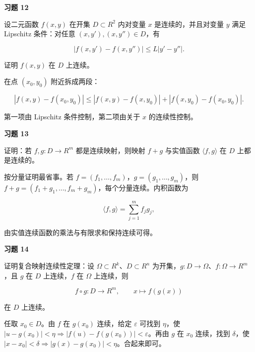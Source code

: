 \begin{exercisebox}
\textbf{习题 12}

设二元函数 \(f(x,y)\) 在开集 \(D\subset R^2\) 内对变量 \(x\) 是连续的，并且对变量 \(y\) 满足 Lipschitz 条件：对任意 \((x,y'),(x,y'')\in D\)，有

\[
        |f(x,y')-f(x,y'')|\le L|y'-y''|.
      \]

证明 \(f(x,y)\) 在 \(D\) 上连续。

\begin{hintbox}
在点 \((x_0,y_0)\) 附近拆成两段：

\[
          |f(x,y)-f(x_0,y_0)|
          \le |f(x,y)-f(x,y_0)|+|f(x,y_0)-f(x_0,y_0)|.
        \]

第一项由 Lipschitz 条件控制，第二项由关于 \(x\) 的连续性控制。
\end{hintbox}
\end{exercisebox}

\begin{exercisebox}
\textbf{习题 13}

证明：若 \(f,g:D\to R^m\) 都是连续映射，则映射 \(f+g\) 与实值函数 \(\langle f,g\rangle\) 在 \(D\) 上都是连续的。

\begin{hintbox}
按分量证明最省事。若 \(f=(f_1,\ldots,f_m)\)，\(g=(g_1,\ldots,g_m)\)，则 \(f+g=(f_1+g_1,\ldots,f_m+g_m)\)，每个分量连续。内积函数为

\[
          \langle f,g\rangle=\sum_{j=1}^{m}f_jg_j,
        \]

由实值连续函数的乘法与有限求和保持连续可得。
\end{hintbox}
\end{exercisebox}

\begin{exercisebox}
\textbf{习题 14}

证明复合映射连续性定理：设 \(\Omega\subset R^k\)、\(D\subset R^n\) 为开集，\(g:D\to\Omega\)、\(f:\Omega\to R^m\)，且 \(g\) 在 \(D\) 上连续，\(f\) 在 \(\Omega\) 上连续，则

\[
        f\circ g:D\to R^m,\qquad x\mapsto f(g(x))
      \]

在 \(D\) 上连续。

\begin{hintbox}
任取 \(x_0\in D\)。由 \(f\) 在 \(g(x_0)\) 连续，给定 \(\varepsilon\) 可找到 \(\eta\)，使 \(|u-g(x_0)|<\eta\Rightarrow |f(u)-f(g(x_0))|<\varepsilon\)。再由 \(g\) 在 \(x_0\) 连续，找到 \(\delta\)，使 \(|x-x_0|<\delta\Rightarrow |g(x)-g(x_0)|<\eta\)。合起来即可。
\end{hintbox}
\end{exercisebox}

